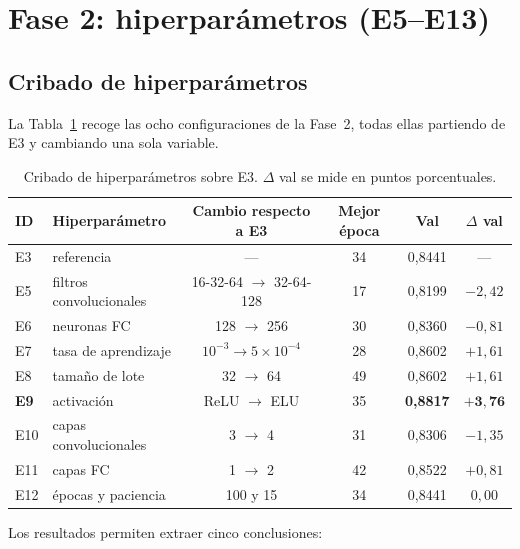 \documentclass[11pt,a4paper]{article}
\begin{document}
\section{Fase 2: hiperparámetros (E5--E13)}

\subsection{Cribado de hiperparámetros}

La Tabla~\ref{tab:fase2} recoge las ocho configuraciones de la Fase~2, todas ellas partiendo de E3 y cambiando una sola variable.

\begin{table}[htbp]
\centering
\small
\caption{Cribado de hiperparámetros sobre E3. $\Delta$ val se mide en puntos porcentuales.}
\label{tab:fase2}
\begin{tabular}{llcccc}
\toprule
ID & Hiperparámetro & Cambio respecto a E3 & Mejor época & Val & $\Delta$ val \\
\midrule
E3 & referencia & --- & 34 & 0,8441 & --- \\
E5 & filtros convolucionales & 16-32-64 $\rightarrow$ 32-64-128 & 17 & 0,8199 & $-2{,}42$ \\
E6 & neuronas FC & 128 $\rightarrow$ 256 & 30 & 0,8360 & $-0{,}81$ \\
E7 & tasa de aprendizaje & $10^{-3}\rightarrow5\times10^{-4}$ & 28 & 0,8602 & $+1{,}61$ \\
E8 & tamaño de lote & 32 $\rightarrow$ 64 & 49 & 0,8602 & $+1{,}61$ \\
\textbf{E9} & activación & ReLU $\rightarrow$ ELU & 35 & \textbf{0,8817} & $\mathbf{+3{,}76}$ \\
E10 & capas convolucionales & 3 $\rightarrow$ 4 & 31 & 0,8306 & $-1{,}35$ \\
E11 & capas FC & 1 $\rightarrow$ 2 & 42 & 0,8522 & $+0{,}81$ \\
E12 & épocas y paciencia & 100 y 15 & 34 & 0,8441 & $0{,}00$ \\
\bottomrule
\end{tabular}
\end{table}

Los resultados permiten extraer cinco conclusiones:
\end{document}
